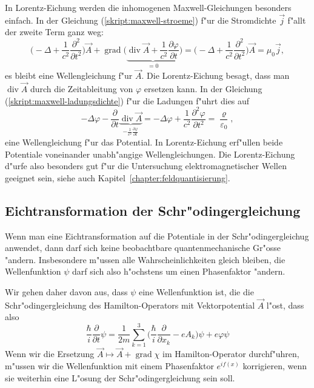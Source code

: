 In Lorentz-Eichung werden die inhomogenen Maxwell-Gleichungen
besonders einfach.
In der Gleichung (\ref{skript:maxwell-stroeme})
f"ur die Stromdichte $\vec j$ f"allt der zweite Term ganz weg:
\[
\biggl(-\Delta + \frac1{c^2}\frac{\partial^2}{\partial t^2}\biggr)\vec A
+\operatorname{grad}\biggl(\underbrace{\operatorname{div}\vec A +\frac1{c^2}\frac{\partial\varphi}{\partial t}}_{=0}\biggr)
=
\biggl(-\Delta + \frac1{c^2}\frac{\partial^2}{\partial t^2}\biggr)\vec A
=\mu_0\vec j,
\]
es bleibt eine Wellengleichung f"ur $\vec A$. Die Lorentz-Eichung
besagt, dass man $\operatorname{div}\vec A$ durch die Zeitableitung
von $\varphi$ ersetzen kann.
In der Gleichung (\ref{skript:maxwell-ladungsdichte}) f"ur die Ladungen
f"uhrt dies auf
\[
-\Delta\varphi -\frac{\partial}{\partial t}\underbrace{\operatorname{div}\vec A}_{-\frac1{c^2}\frac{\partial\varphi}{\partial t}}
=
-\Delta\varphi +\frac1{c^2}\frac{\partial^2\varphi}{\partial t^2}
=\frac{\varrho}{\varepsilon_0},
\]
eine Wellengleichung f"ur das Potential.
In Lorentz-Eichung erf"ullen beide Potentiale voneinander
unabh"angige Wellengleichungen.
Die Lorentz-Eichung d"urfe also besonders gut f"ur die Untersuchung
elektromagnetischer Wellen geeignet sein, siehe auch
Kapitel~\ref{chapter:feldquantisierung}.

\subsection{Eichtransformation der Schr"odingergleichung}
Wenn man eine Eichtransformation auf die Potentiale in der
Schr"odingergleichug anwendet, dann darf sich keine beobachtbare
quantenmechanische Gr"osse "andern. Insbesondere m"ussen alle
Wahrscheinlichkeiten gleich bleiben, die Wellenfunktion
$\psi$ darf sich also h"ochstens um einen Phasenfaktor "andern.

Wir gehen daher davon aus, dass $\psi$ eine Wellenfunktion ist,
die die Schr"odingergleichung des Hamilton-Operators mit Vektorpotential
$\vec A$ l"ost, dass also
\[
\frac{\hbar}{i}\frac{\partial}{\partial t}\psi
=
\frac1{2m}\sum_{k=1}^3\biggl(\frac{\hbar}{i}\frac{\partial}{\partial x_k}-eA_k\biggr)\psi
+e\varphi\psi
\]
Wenn wir die Ersetzung
$\vec A\mapsto \vec A+\operatorname{grad}\chi$
im Hamilton-Operator durchf"uhren, m"ussen wir die Wellenfunktion
mit einem Phasenfaktor $e^{if(x)}$ korrigieren, wenn sie weiterhin
eine L"osung der Schr"odingergleichung sein soll.

